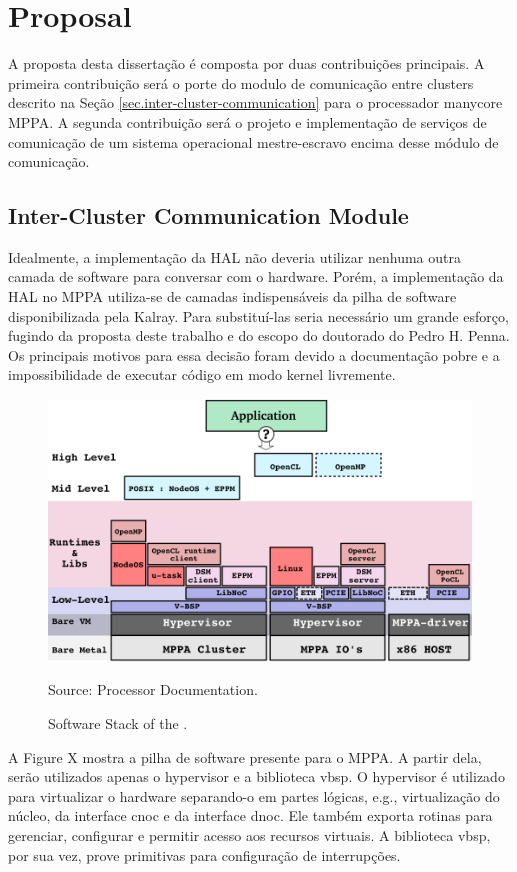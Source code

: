 \chapter{Proposal}
\label{ch.proposal}

A proposta desta dissertação é composta por duas contribuições principais.
A primeira contribuição será o porte do modulo de comunicação entre clusters
descrito na Seção \ref{sec.inter-cluster-communication} para o processador manycore MPPA.
A segunda contribuição será o projeto e implementação de serviços de comunicação de
um sistema operacional mestre-escravo encima desse módulo de comunicação.

\section{Inter-Cluster Communication Module}

    Idealmente, a implementação da HAL não deveria utilizar nenhuma outra camada
	de software para conversar com o hardware.
	Porém, a implementação da HAL no MPPA utiliza-se de camadas indispensáveis
	da pilha de software disponibilizada pela Kalray.
	Para substituí-las seria necessário um grande esforço, fugindo da proposta
	deste trabalho e do escopo do doutorado do Pedro H. Penna.
	Os principais motivos para essa decisão foram devido a documentação pobre
	e a impossibilidade de executar código em modo kernel livremente.
	
	\begin{figure}[t]
		\centering
		\caption{Software Stack of the \mppa.}

		\includegraphics[width=.7\textwidth]{images/software-stack.png}

		Source: \mppa Processor Documentation.

		\label{fig.conpt_sync}
	\end{figure}

	A Figure X mostra a pilha de software presente para o MPPA.
	A partir dela, serão utilizados apenas o hypervisor e a biblioteca vbsp.
	O hypervisor é utilizado para virtualizar o hardware separando-o em partes lógicas,
	e.g., virtualização do núcleo, da interface cnoc e da interface dnoc.
	Ele também exporta rotinas para gerenciar, configurar e permitir acesso aos recursos virtuais.
	A biblioteca vbsp, por sua vez, prove primitivas para configuração de interrupções.

